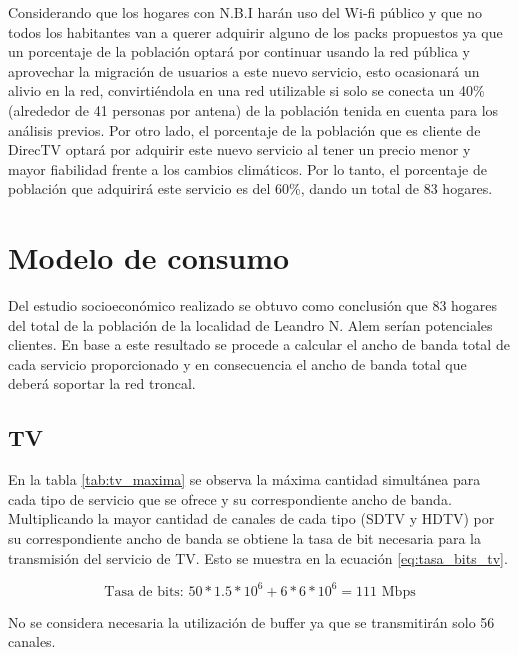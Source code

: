 \documentclass[11pt,a4paper]{article}
\begin{document}
Considerando que los hogares con N.B.I harán uso del Wi-fi público y que no todos los habitantes van a querer adquirir alguno de los packs propuestos ya que un porcentaje de la población optará por continuar usando la red pública y aprovechar la migración de usuarios a este nuevo servicio, esto ocasionará un alivio en la red, convirtiéndola en una red utilizable si solo se conecta un 40\% (alrededor de 41 personas por antena) de la población tenida en cuenta para los análisis previos.
Por otro lado, el porcentaje de la población que es cliente de DirecTV optará por adquirir este nuevo servicio al tener un precio menor y mayor fiabilidad frente a los cambios climáticos.
Por lo tanto, el porcentaje de población que adquirirá este servicio es del 60\%, dando un total de 83 hogares.



\section{Modelo de consumo}

Del estudio socioeconómico realizado se obtuvo como conclusión que 83 hogares del total de la población de la localidad de Leandro N. Alem serían potenciales clientes. 
En base a este resultado se procede a calcular el ancho de banda total de cada servicio proporcionado y en consecuencia el ancho de banda total que deberá soportar la red troncal.

\subsection{TV}

En la tabla \ref{tab:tv_maxima} se observa la máxima cantidad simultánea para cada tipo de servicio que se ofrece y su correspondiente ancho de banda. Multiplicando la mayor cantidad de canales de cada tipo (SDTV y HDTV) por su correspondiente ancho de banda se obtiene la tasa de bit necesaria para la transmisión del servicio de TV.
Esto se muestra en la ecuación \ref{eq:tasa_bits_tv}.

\begin{equation}
    \text{Tasa de bits: } 50*1.5*10^6+6*6*10^6=111 \text{ Mbps}
    \label{eq:tasa_bits_tv}
\end{equation}

No se considera necesaria la utilización de buffer ya que se transmitirán solo 56 canales.
\end{document}
